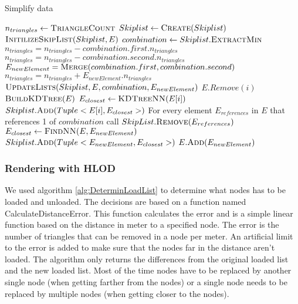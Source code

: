 \begin{algorithm}[h]
\caption{Simplify data}\label{alg:SimplifyData}
\begin{algorithmic}[1]
 
\State {}
\State $n_{triangles} \gets \Call{TriangleCount}{}$
\State $Skiplist \gets \Call{Create}{Skiplist}$ 
\State $\Call{InitilizeSkipList}{Skiplist, E}$
    \State $combination \gets Skiplist.\Call{ExtractMin}{}$
    \State $n_{triangles} = n_{triangles} - combination.first.n_{triangles}$
    \State $n_{triangles} = n_{triangles} - combination.second.n_{triangles}$
    \State $E_{newElement} = \Call{Merge}{combination.first, combination.second}$
    \State $n_{triangles} = n_{triangles} + E_{newElement}.n_{triangles}$
    \State $\Call{UpdateLists}{Skiplist, E, combination, E_{newElement}}$
\EndWhile
\EndProcedure
{}
        \State $E.Remove(i)$
    \EndIf
\EndFor
\EndFunction
{}
\State $\Call{BuildKDTree}{E}$
    \State $E_{closest} \gets \Call{KDTreeNN}{E[i]}$ 
    \State $Skiplist.\Call{Add}{Tuple<E[i], E_{closest}>}$
\EndFor
\EndFunction
{}
\State For every element $E_{references}$ in $E$ that references 1 of $combination$ call $SkipList.\Call{Remove}{E_{references}}$
\State $E_{closest} \gets \Call{FindNN}{E, E_{newElement}}$ 
\State $Skiplist.\Call{Add}{Tuple<E_{newElement}, E_{closest}>}$
\State $E.\Call{Add}{E_{newElement}}$
\EndFunction
\end{algorithmic}
\end{algorithm}

\subsubsection{Rendering with HLOD}
We used algorithm \ref{alg:DeterminLoadList} to determine what nodes has to be loaded and unloaded. The decisions are based on a function named CalculateDistanceError. This function calculates the error and is a simple linear function based on the distance in meter to a specified node. The error is the number of triangles that can be removed in a node per meter. An artificial limit to the error is added to make sure that the nodes far in the distance aren't loaded. The algorithm only returns the differences from the original loaded list and the new loaded list. Most of the time nodes have to be replaced by another single node (when getting farther from the nodes) or a single node needs to be replaced by multiple nodes (when getting closer to the nodes).

